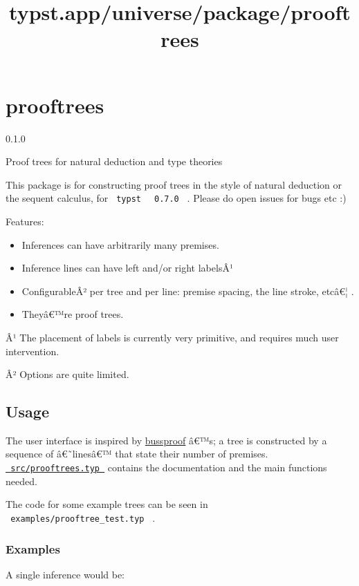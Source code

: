 \title{typst.app/universe/package/prooftrees}

\label{banner}
\section{prooftrees}\label{prooftrees}

{ 0.1.0 }

Proof trees for natural deduction and type theories

\label{readme}
This package is for constructing proof trees in the style of natural
deduction or the sequent calculus, for \texttt{\ typst\ }
\texttt{\ 0.7.0\ } . Please do open issues for bugs etc :)

Features:

\begin{itemize}
\tightlist
\item
  Inferences can have arbitrarily many premises.
\item
  Inference lines can have left and/or right labelsÂ¹
\item
  ConfigurableÂ² per tree and per line: premise spacing, the line
  stroke, etcâ€¦ .
\item
  Theyâ€™re proof trees.
\end{itemize}

Â¹ The placement of labels is currently very primitive, and requires
much user intervention.

Â² Options are quite limited.

\subsection{Usage}\label{usage}

The user interface is inspired by
\href{https://ctan.org/pkg/bussproofs}{bussproof} â€™s; a tree is
constructed by a sequence of â€˜linesâ€™ that state their number of
premises.
\href{https://github.com/typst/packages/raw/main/packages/preview/prooftrees/0.1.0/src/prooftrees.typ}{\texttt{\ src/prooftrees.typ\ }}
contains the documentation and the main functions needed.

The code for some example trees can be seen in
\texttt{\ examples/prooftree\_test.typ\ } .

\subsubsection{Examples}\label{examples}

A single inference would be:

